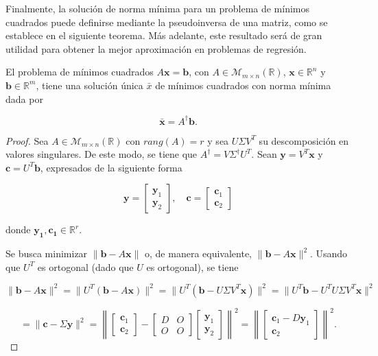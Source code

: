 Finalmente, la solución de norma mínima para un problema de mínimos cuadrados puede definirse mediante la pseudoinversa de una matriz, como se establece en el siguiente teorema. Más adelante, este resultado será de gran utilidad para obtener la mejor aproximación en problemas de regresión.

\begin{teorema}
    El problema de mínimos cuadrados $A\mathbf{x}=\mathbf{b}$, con $A \in \mathcal{M}_{m \times n}(\mathbb{R})$, $\mathbf{x} \in \mathbb{R}^{n}$ y $\mathbf{b} \in \mathbb{R}^{m}$, tiene una solución única $\bar{x}$ de mínimos cuadrados con norma mínima dada por

    \[ \bar{\mathbf{x}} = A^{\dagger}\mathbf{b}. \]
\end{teorema}

\begin{proof}
    Sea $A \in \mathcal{M}_{m \times n}(\mathbb{R})$ con $rang(A) = r$ y sea $U\Sigma V^{T}$ su descomposición en valores singulares. De este modo, se tiene que $A^{\dagger} = V \Sigma^{\dagger} U^{T}$. Sean $\mathbf{y}=V^{T}\mathbf{x}$ y $\mathbf{c}=U^{T}\mathbf{b}$, expresados de la siguiente forma

    \[
        \mathbf{y} = \begin{bmatrix} \mathbf{y}_1 \\ \mathbf{y}_2 \end{bmatrix}, \quad 
        \mathbf{c} = \begin{bmatrix} \mathbf{c}_1 \\ \mathbf{c}_2 \end{bmatrix}
    \]

    donde $\mathbf{y_1}, \mathbf{c_1} \in \mathbb{R}^{r}$.\newline

    Se busca minimizar $\|\mathbf{b} - A \mathbf{x}\|$ o, de manera equivalente, $\|\mathbf{b} - A \mathbf{x}\|^2$. Usando que $U^T$ es ortogonal (dado que $U$ es ortogonal), se tiene  

    \[
        \|\mathbf{b} - A \mathbf{x}\|^2 = \| U^T (\mathbf{b} - A \mathbf{x}) \|^2 = \| U^T (\mathbf{b} - U \Sigma V^T \mathbf{x}) \|^2 = \| U^T \mathbf{b} - U^T U \Sigma V^T \mathbf{x} \|^2
    \]

    \[
        = \|\mathbf{c} - \Sigma \mathbf{y}\|^2 = \left\| \begin{bmatrix} \mathbf{c}_1 \\ \mathbf{c}_2 \end{bmatrix} - \begin{bmatrix} D & O \\ O & O \end{bmatrix} \begin{bmatrix} \mathbf{y}_1 \\ \mathbf{y}_2 \end{bmatrix} \right\|^2 = \left\| \begin{bmatrix} \mathbf{c}_1 - D \mathbf{y}_1 \\ \mathbf{c}_2 \end{bmatrix} \right\|^2.
    \]\newline


\end{proof}
